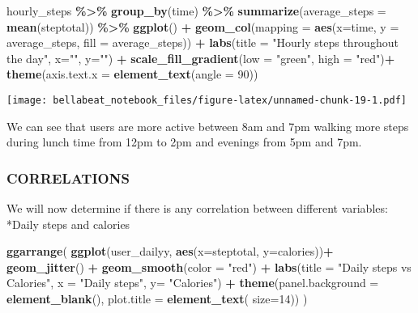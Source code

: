 \documentclass[
]{article}
\newenvironment{Shaded}{\begin{snugshade}}{\end{snugshade}}
\newcommand{\AttributeTok}[1]{\textcolor[rgb]{0.13,0.29,0.53}{#1}}
\newcommand{\DecValTok}[1]{\textcolor[rgb]{0.00,0.00,0.81}{#1}}
\newcommand{\FunctionTok}[1]{\textcolor[rgb]{0.13,0.29,0.53}{\textbf{#1}}}
\newcommand{\NormalTok}[1]{#1}
\newcommand{\SpecialCharTok}[1]{\textcolor[rgb]{0.81,0.36,0.00}{\textbf{#1}}}
\newcommand{\StringTok}[1]{\textcolor[rgb]{0.31,0.60,0.02}{#1}}
\begin{document}
\begin{Shaded}
\begin{Highlighting}[]
\NormalTok{hourly\_steps }\SpecialCharTok{\%\textgreater{}\%}
  \FunctionTok{group\_by}\NormalTok{(time) }\SpecialCharTok{\%\textgreater{}\%}
  \FunctionTok{summarize}\NormalTok{(}\AttributeTok{average\_steps =} \FunctionTok{mean}\NormalTok{(steptotal)) }\SpecialCharTok{\%\textgreater{}\%}
  \FunctionTok{ggplot}\NormalTok{() }\SpecialCharTok{+}
  \FunctionTok{geom\_col}\NormalTok{(}\AttributeTok{mapping =} \FunctionTok{aes}\NormalTok{(}\AttributeTok{x=}\NormalTok{time, }\AttributeTok{y =}\NormalTok{ average\_steps, }\AttributeTok{fill =}\NormalTok{ average\_steps)) }\SpecialCharTok{+} 
  \FunctionTok{labs}\NormalTok{(}\AttributeTok{title =} \StringTok{"Hourly steps throughout the day"}\NormalTok{, }\AttributeTok{x=}\StringTok{""}\NormalTok{, }\AttributeTok{y=}\StringTok{""}\NormalTok{) }\SpecialCharTok{+} 
  \FunctionTok{scale\_fill\_gradient}\NormalTok{(}\AttributeTok{low =} \StringTok{"green"}\NormalTok{, }\AttributeTok{high =} \StringTok{"red"}\NormalTok{)}\SpecialCharTok{+}
  \FunctionTok{theme}\NormalTok{(}\AttributeTok{axis.text.x =} \FunctionTok{element\_text}\NormalTok{(}\AttributeTok{angle =} \DecValTok{90}\NormalTok{))}
\end{Highlighting}
\end{Shaded}

\texttt{[image: bellabeat\_notebook\_files/figure-latex/unnamed-chunk-19-1.pdf]}

We can see that users are more active between 8am and 7pm walking more
steps during lunch time from 12pm to 2pm and evenings from 5pm and 7pm.

\hypertarget{correlations}{%
\subsubsection{CORRELATIONS}\label{correlations}}

We will now determine if there is any correlation between different
variables: *Daily steps and calories

\begin{Shaded}
\begin{Highlighting}[]
\FunctionTok{ggarrange}\NormalTok{(}
\FunctionTok{ggplot}\NormalTok{(user\_dailyy, }\FunctionTok{aes}\NormalTok{(}\AttributeTok{x=}\NormalTok{steptotal, }\AttributeTok{y=}\NormalTok{calories))}\SpecialCharTok{+}
  \FunctionTok{geom\_jitter}\NormalTok{() }\SpecialCharTok{+}
  \FunctionTok{geom\_smooth}\NormalTok{(}\AttributeTok{color =} \StringTok{"red"}\NormalTok{) }\SpecialCharTok{+} 
  \FunctionTok{labs}\NormalTok{(}\AttributeTok{title =} \StringTok{"Daily steps vs Calories"}\NormalTok{, }\AttributeTok{x =} \StringTok{"Daily steps"}\NormalTok{, }\AttributeTok{y=} \StringTok{"Calories"}\NormalTok{) }\SpecialCharTok{+}
   \FunctionTok{theme}\NormalTok{(}\AttributeTok{panel.background =} \FunctionTok{element\_blank}\NormalTok{(),}
        \AttributeTok{plot.title =} \FunctionTok{element\_text}\NormalTok{( }\AttributeTok{size=}\DecValTok{14}\NormalTok{))}
\NormalTok{)}
\end{Highlighting}
\end{Shaded}
\end{document}
